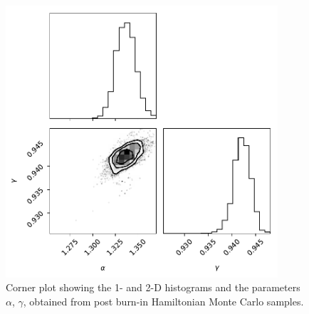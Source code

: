 \documentclass{article}
\begin{document}
\begin{figure}
    \centering
    \includegraphics[width=0.9\textwidth]{figs/hmc_corner.pdf}
    \caption{Corner plot showing the 1- and 2-D histograms and the parameters $\alpha$, $\gamma$, obtained from post burn-in Hamiltonian Monte Carlo samples.}
    \label{fig:hmc_corner}
\end{figure}

\printbibliography
\end{document}
